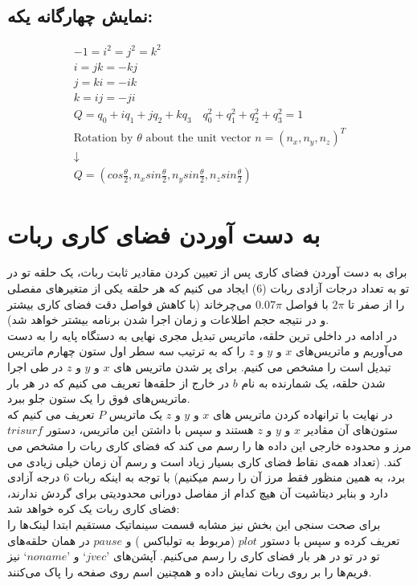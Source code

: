 \documentclass{article}
\begin{document}
\subsection{نمایش چهارگانه یکه:}
\begin{latin}
\begin{gather*}
-1 = i^2 = j^2 = k^2 \\ i = jk = -kj\\ j = ki = -ik \\k = ij = -ji \\
Q = q_0 + iq_1 + jq_2 + kq_3 \quad q_0^2 + q_1^2 + q_2^2 + q_3^2 = 1 \\
\text{Rotation by $\theta$ about the unit vector $n = (n_x, n_y, n_z)^T$} \\
\downarrow \\
Q = (cos \frac{\theta}{2},n_x sin \frac{\theta}{2}, n_y sin \frac{\theta}{2},n_z sin \frac{\theta}{2})
\end{gather*}
\end{latin}

\section{به دست آوردن فضای کاری ربات}
برای به دست آوردن فضای کاری پس از تعیین کردن مقادیر ثابت ربات، یک حلقه تو در تو به تعداد درجات آزادی ربات (6) ایجاد می کنیم که هر حلقه یکی از متغیر‌های مفصلی را از صفر تا $2\pi$ با فواصل $0.07\pi$ می‌چرخاند (با کاهش فواصل دقت فضای کاری بیشتر و در نتیجه حجم اطلاعات و زمان اجرا شدن برنامه بیشتر خواهد شد).
\\
در ادامه در داخلی ترین حلقه، ماتریس تبدیل مجری نهایی به دستگاه پایه را به دست می‌آوریم و ماتریس‌های $x$ و $y$ و $z$ را که به ترتیب سه سطر اول ستون چهارم ماتریس تبدیل است را مشخص می کنیم. 
برای پر شدن ماتریس های $x$ و $y$ و $z$ در طی اجرا شدن حلقه، یک شمارنده  به نام $b$ در خارج از حلقه‌ها تعریف می کنیم که در هر بار ماتریس‌های فوق را یک ستون جلو ببرد.
\\
در نهایت با ترانهاده کردن ماتریس های $x$ و $y$ و $z$ یک ماتریس $P$ تعریف می کنیم که ستون‌های آن مقادیر $x$ و $y$ و $z$ هستند و سپس با داشتن این ماتریس، دستور $trisurf$ مرز و محدوده خارجی این داده ها را رسم می کند که فضای کاری ربات را مشخص می کند. (تعداد همه‌ی نقاط فضای کاری بسیار زیاد است و رسم آن زمان خیلی زیادی می برد، به همین منظور فقط مرز آن را رسم میکنیم)
با توجه به اینکه ربات 6 درجه آزادی دارد و بنابر دیتاشیت آن هیچ کدام از مفاصل دورانی محدودیتی برای گردش ندارند، فضای کاری ربات یک کره خواهد شد:
\\
برای صحت سنجی این بخش نیز مشابه قسمت سینماتیک مستقیم ابتدا لینک‌ها را تعریف کرده و سپس با دستور $plot$ (مربوط به تولباکس ) و $pause$ در همان حلقه‌های تو در تو در هر بار فضای کاری را رسم می‌کنیم. آپشن‌های $‘jvec’$ و $‘noname’$ نیز فریم‌ها را بر روی ربات نمایش داده و همچنین اسم روی صفحه را پاک می‌کنند.
\end{document}
